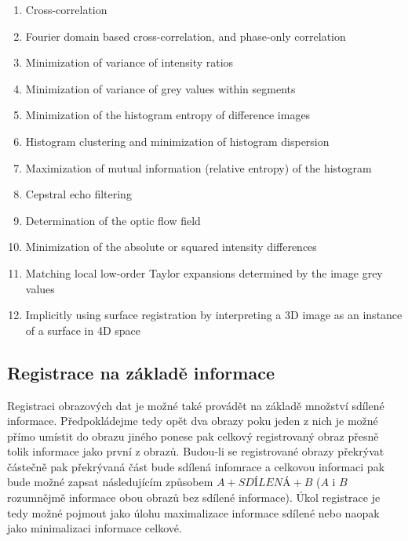 \documentclass{thesis}%
\begin{document}
\begin{enumerate}
\item Cross-correlation 
\item Fourier domain based cross-correlation, and phase-only correlation
\item Minimization of variance of intensity ratios
\item Minimization of variance of grey values within segments
\item Minimization of the histogram entropy of difference images
\item Histogram clustering and minimization of histogram dispersion
\item Maximization of mutual information (relative entropy) of the histogram
\item Cepstral echo filtering
\item Determination of the optic flow field
\item Minimization of the absolute or squared intensity differences
\item Matching local low-order Taylor expansions determined by the image grey values
\item Implicitly using surface registration by interpreting a 3D image as an instance of a surface in 4D space
\end{enumerate}

\subsection{Registrace na základě informace}
Registraci obrazových dat je možné také provádět na základě množství sdílené informace. Předpokládejme tedy opět dva obrazy poku jeden z nich je možné přímo umístit do obrazu jiného ponese pak celkový registrovaný obraz přesně tolik informace jako první z obrazů. Budou-li se registrované obrazy překrývat částečně pak překrývaná část bude sdílená infomrace a celkovou informaci pak bude možné zapsat následujícím způsobem $A+SDÍLENÁ+B$ ($A$ i $B$ rozumnějmě informace obou obrazů bez sdílené informace). Úkol registrace je tedy možné pojmout jako úlohu maximalizace informace sdílené nebo naopak jako minimalizaci informace celkové.
\end{document}
